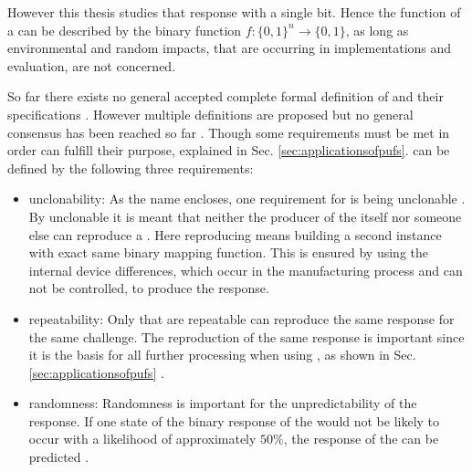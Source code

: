 However this thesis studies \pufs that response with a single bit.
Hence the function of a \puf can be described by the binary function $f: \{0, 1\}^n \to \{0,1\}$, as long as environmental and random impacts, that are occurring in \puf implementations and evaluation, are not concerned. %

So far there exists no general accepted complete formal definition of \pufs and their specifications \cite{Becker2015ThePUFs}.
However multiple definitions are proposed but no general consensus has been reached so far \cite{Armknecht2011AFunctions,Ruhrmair2014PUFsGlance,Tehranipoor2012IntroductionTrust}.
Though some requirements must be met in order \pufs can fulfill their purpose, explained in Sec. \ref{sec:applicationsofpufs}.
\pufs can be defined by the following three requirements:


\begin{itemize}
\item unclonability: As the name \puf encloses, one requirement for \pufs is being unclonable \cite{Tajik2014PhysicalPUFs}.
By unclonable it is meant that neither the producer of the \puf itself nor someone else can reproduce a \puf.
Here reproducing means building a second instance with exact same binary mapping function.
This is ensured by using the internal device differences, which occur in the manufacturing process and can not be controlled, to produce the \puf response.
\item repeatability: Only \pufs that are repeatable can reproduce the same response for the same challenge.
The reproduction of the same response is important since it is the basis for all further processing when using \pufs, as shown in Sec. \ref{sec:applicationsofpufs} \cite{Armknecht2011AFunctions}.
\item randomness: Randomness is important for the unpredictability of the \puf response.
If one state of the binary response of the \puf would not be likely to occur with a likelihood of approximately $50 \%$, the response of the \puf can be predicted \cite{CherifJouini2011PerformanceStatistics}.
\end{itemize}

